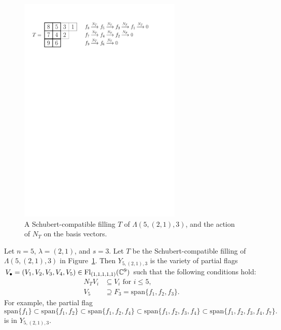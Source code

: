 \documentclass[12pt]{amsart}
\newcommand{\vspan}{\mathrm{span}}
\newcommand{\Fl}{\mathrm{Fl}}
\begin{document}
\begin{figure}
    \centering
    \includegraphics[width=0.7\textwidth]{Figures/SchubertCompatible.pdf}
    \caption{A Schubert-compatible filling $T$ of $\Lambda(5,(2,1),3)$, and the action of $N_T$ on the basis vectors.}
    \label{fig:SchubertCompatible}
\end{figure}

\begin{example}
Let $n=5$, $\lambda = (2,1)$, and $s=3$. Let $T$ be the Schubert-compatible filling of $\Lambda(5,(2,1),3)$ in Figure~\ref{fig:SchubertCompatible}. Then $Y_{5,(2,1),3}$ is the variety of partial flags $V_\bullet = (V_1,V_2,V_3,V_4,V_5)\in \Fl_{(1,1,1,1,1)}(\bC^9)$ such that the following conditions hold:
\begin{align}
N_T V_i &\subseteq V_{i} \text{ for } i \leq 5, \\
V_5 &\supseteq F_3 = \vspan\{f_1,f_2,f_3\}.
\end{align}
For example, the partial flag 
\begin{equation*}\label{eq:PartialFlag}
\vspan\{ f_1 \} \subset \vspan\{ f_1,f_2 \} \subset 
\vspan\{ f_{1},f_{2},f_{4} \} \subset \vspan\{ f_{1},f_{2},f_{3},f_{4} \} \subset \vspan\{ f_{1},f_{2},f_{3},f_{4},f_{7}\}.
\end{equation*}
is in $Y_{5,(2,1),3}$.
\end{example}
\end{document}

